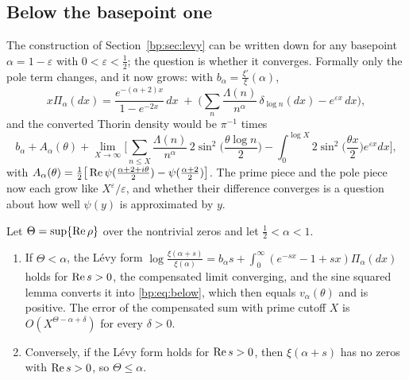 \subsection{Below the basepoint one}\label{bp:sec:below}

The construction of Section~\ref{bp:sec:levy} can be written down for any basepoint $\alpha=1-\varepsilon$ with $0<\varepsilon<\frac12$; the question is whether it converges. Formally only the pole term changes, and it now grows: with $b_\alpha=\frac{\xi'}\xi(\alpha)$,
\[
x\Pi_\alpha(dx)=\frac{e^{-(\alpha+2)x}}{1-e^{-2x}}\,dx\;+\;\Big(\sum_n\frac{\Lambda(n)}{n^{\alpha}}\,\delta_{\log n}(dx)-e^{\varepsilon x}\,dx\Big),
\]
and the converted Thorin density would be $\pi^{-1}$ times
\begin{equation}\label{bp:eq:below}
b_\alpha+A_\alpha(\theta)+\lim_{X\to\infty}\Big[\sum_{n\le X}\frac{\Lambda(n)}{n^\alpha}\,2\sin^2\Big(\frac{\theta\log n}2\Big)-\int_0^{\log X}2\sin^2\Big(\frac{\theta x}2\Big)e^{\varepsilon x}dx\Big],
\end{equation}
with $A_\alpha(\theta)=\frac12\big[\operatorname{Re}\psi(\frac{\alpha+2+i\theta}2)-\psi(\frac{\alpha+2}2)\big]$. The prime piece and the pole piece now each grow like $X^\varepsilon/\varepsilon$, and whether their difference converges is a question about how well $\psi(y)$ is approximated by $y$.

\begin{proposition}\label{bp:prop:below}
Let $\Theta=\sup\{\operatorname{Re}\rho\}$ over the nontrivial zeros and let $\frac12<\alpha<1$.
\begin{enumerate}
\item If $\Theta<\alpha$, the L\'evy form $\log\frac{\xi(\alpha+s)}{\xi(\alpha)}=b_\alpha s+\int_0^\infty(e^{-sx}-1+sx)\Pi_\alpha(dx)$ holds for $\operatorname{Re} s>0$, the compensated limit converging, and the sine squared lemma converts it into \eqref{bp:eq:below}, which then equals $v_\alpha(\theta)$ and is positive. The error of the compensated sum with prime cutoff $X$ is $O(X^{\Theta-\alpha+\delta})$ for every $\delta>0$.
\item Conversely, if the L\'evy form holds for $\operatorname{Re} s>0$, then $\xi(\alpha+s)$ has no zeros with $\operatorname{Re} s>0$, so $\Theta\le\alpha$.
\end{enumerate}
\end{proposition}

